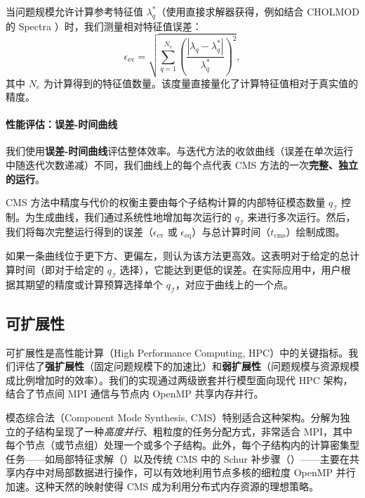 当问题规模允许计算参考特征值 $\lambda_q^*$（使用直接求解器获得，例如结合 CHOLMOD \cite{2008ChenCholmod} 的 Spectra \cite{Qiu2015Spectra}）时，我们测量相对特征值误差：
\begin{equation}
  \epsilon_{\text{ev}} = \sqrt{\sum_{q=1}^{N_e} \left( \frac{|\lambda_q - \lambda_q^*|}{\lambda_q^*} \right)^2},
  \label{eq:error-ev}
\end{equation}
其中 $N_e$ 为计算得到的特征值数量。该度量直接量化了计算特征值相对于真实值的精度。

\paragraph{性能评估：误差-时间曲线}
我们使用\textbf{误差-时间曲线}评估整体效率。与迭代方法的收敛曲线（误差在单次运行中随迭代次数递减）不同，我们曲线上的每个点代表 CMS 方法的一次\textbf{完整、独立的运行}。

CMS 方法中精度与代价的权衡主要由每个子结构计算的内部特征模态数量 $q_{\mathcal{I}}$ 控制。为生成曲线，我们通过系统性地增加每次运行的 $q_{\mathcal{I}}$ 来进行多次运行。然后，我们将每次完整运行得到的误差（$\epsilon_{\text{ev}}$ 或 $\epsilon_{\text{eq}}$）与总计算时间（$t_{\text{cms}}$）绘制成图。

如果一条曲线位于更下方、更偏左，则认为该方法更高效。这表明对于给定的总计算时间（即对于给定的 $q_{\mathcal{I}}$ 选择），它能达到更低的误差。在实际应用中，用户根据其期望的精度或计算预算选择单个 $q_{\mathcal{I}}$，对应于曲线上的一个点。

\subsection{可扩展性}\label{sec:scaling}
可扩展性是高性能计算（High Performance Computing, HPC）中的关键指标。我们评估了\textbf{强扩展性}（固定问题规模下的加速比）和\textbf{弱扩展性}（问题规模与资源规模成比例增加时的效率）。我们的实现通过两级嵌套并行模型面向现代 HPC 架构，结合了节点间 MPI 通信与节点内 OpenMP 共享内存并行。

模态综合法（Component Mode Synthesis, CMS）特别适合这种架构。分解为独立的子结构呈现了一种\textit{高度并行}、粗粒度的任务分配方式，非常适合 MPI，其中每个节点（或节点组）处理一个或多个子结构。此外，每个子结构内的计算密集型任务——如局部特征求解（）以及传统 CMS 中的 Schur 补步骤（）——主要在共享内存中对局部数据进行操作，可以有效地利用节点多核的细粒度 OpenMP 并行加速。这种天然的映射使得 CMS 成为利用分布式内存资源的理想策略。

